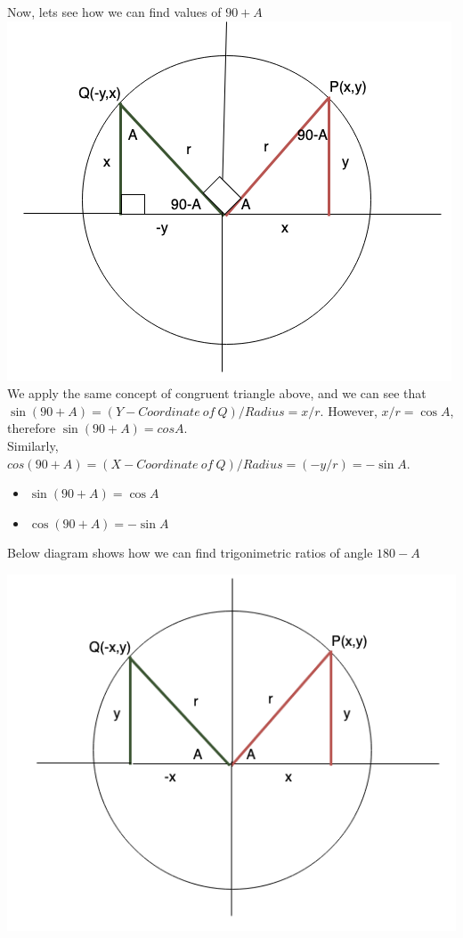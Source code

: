 \documentclass{book}
\begin{document}
	Now, lets see how we can find values of $90+A$ \\
	
	\includegraphics[scale=0.6]{compangle1} \\
	
	
	We apply the same concept of congruent triangle above, and we can see that $\sin(90+A) = (Y-Coordinate \: of \: Q)/Radius = x/r$. However, $x/r = \cos{A}$, therefore $\sin(90+A)=cos{A}$. \\
	Similarly, $cos(90+A) = (X-Coordinate \: of \: Q)/Radius = (-y/r) = -\sin{A}$. \\
	
	\begin{mdframed}[backgroundcolor=yellow]
		\begin{itemize}
			\item$\sin(90+A) = \cos{A}$
			\item $\cos(90+A) = -\sin{A}$
			
		\end{itemize}
	\end{mdframed}

	Below diagram shows how we can find trigonimetric ratios of angle $180-A$
	
	\includegraphics[scale=0.6]{180theta}
	
\end{document}
